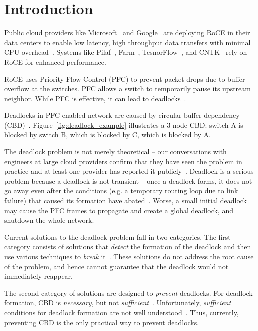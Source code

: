 \section{Introduction}
\label{sec:intro}

Public cloud providers like Microsoft~\cite{dcqcn} and Google~\cite{timely} are
deploying RoCE in their data centers to enable low latency, high throughput data
transfers with minimal CPU overhead~\cite{dcqcn}. Systems like
Pilaf~\cite{pilaf}, Farm~\cite{farm}, TesnorFlow~\cite{tensorflow}, and
CNTK~\cite{cntk} rely on RoCE for enhanced performance.

RoCE uses Priority Flow Control (PFC) to prevent packet drops due to buffer
overflow at the switches. PFC allows a switch to temporarily pause its upstream
neighbor. While PFC is effective, it can lead to
deadlocks~\cite{rdmaatscale,tcpbolt,hu2016deadlocks}.

Deadlocks in PFC-enabled network are caused by circular buffer dependency
(CBD)~\cite{hu2016deadlocks}. Figure~\ref{fig:deadlock_example}
illustrates a 3-node CBD: switch A is blocked by switch B, which is blocked by
C, which is blocked by A.

The deadlock problem is not merely theoretical -- our conversations with
engineers at large cloud providers confirm that they have seen the problem in
practice and at least one provider has reported it publicly~\cite{rdmaatscale}.
Deadlock is a serious problem because a deadlock is not transient -- once a
deadlock forms, it does not go away even after the conditions (e.g. a temporary
routing loop due to link failure) that caused its formation have
abated~\cite{rdmaatscale}. Worse, a small initial deadlock may cause the PFC frames 
to propagate and create a global deadlock, and shutdown the whole network.

Current solutions to the deadlock problem fall in two categories. The first
category consists of solutions that {\em detect} the formation of the deadlock
and then use various techniques to {\em break} it~\cite{shpiner2016unlocking}.
These solutions do not address the root cause of the problem, and hence cannot
guarantee that the deadlock would not immediately reappear.

The second category of solutions are designed to {\em prevent} deadlocks.  For
deadlock formation, CBD is {\em necessary}, but not {\em
sufficient}~\cite{hu2016deadlocks}. Unfortunately, {\em sufficient} conditions
for deadlock formation are not well understood~\cite{hu2016deadlocks}. Thus,
currently, preventing CBD is the only practical way to prevent deadlocks.

